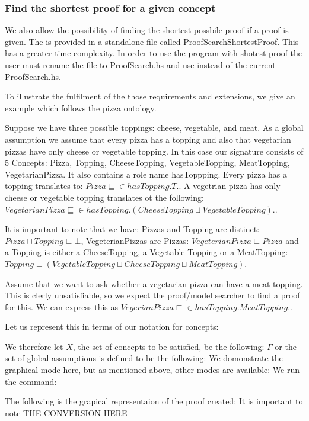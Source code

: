 \subsubsection*{Find the shortest proof for a given concept}
We also allow the possibility of finding the shortest possbile proof if a proof is given. The is provided in a standalone file called ProofSearchShortestProof. This has a greater time complexity. In order to use the program with shotest proof the user must rename the file to ProofSearch.hs and use instead of the current ProofSearch.hs. 

To illustrate the fulfilment of the those requirements and extensions, we give an example which follows the pizza ontology.

Suppose we have three possible toppings: cheese, vegetable, and meat. As a global assumption we assume that every pizza has a topping and also that vegetarian pizzas have only cheese or vegetable topping.
In this case our signature consists of 5 Concepts: Pizza, Topping, CheeseTopping, VegetableTopping, MeatTopping, VegetarianPizza. It also contains a role name hasToppping.
Every pizza has a topping translates to: $Pizza \sqsubseteq \in hasTopping.T.$. A vegetrian pizza has only cheese or vegetable topping translates ot the following: $VegetarianPizza \sqsubseteq \in hasTopping.(CheeseTopping \sqcup VegetableTopping).$. 

It is important to note that we have:
Pizzas and Topping are distinct: $Pizza \sqcap Topping \sqsubseteq \bot$, VegeterianPizzas are Pizzas: $VegeterianPizza \sqsubseteq Pizza$ and a Topping is either a CheeseTopping, a Vegetable Topping or a MeatTopping: $Topping \equiv (VegetableTopping \sqcup CheeseTopping \sqcup MeatTopping)$. 

Assume that we want to ask whether a vegetarian pizza can have a meat topping. This is clerly unsatisfiable, so we expect the proof/model searcher to find a proof for this.
We can express this as $VegerianPizza \sqsubseteq \in hasTopping.MeatTopping.$.

Let us represent this in terms of our notation for concepts:

We therefore let $X$, the set of concepts to be satisfied, be the following: 
$\Gamma$ or the set of global assumptions is defined to be the following: 
We domonstrate the graphical mode here, but as mentioned above, other modes are available:
We run the command: 

The following is the grapical representaion of the proof created:
It is important to note THE CONVERSION HERE

